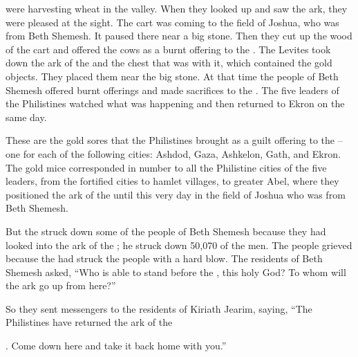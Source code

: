 {were harvesting
wheat
in the valley.
When
they looked
up and saw
the ark,
they were pleased
at
the sight.
The cart
was coming
to
the field
of Joshua,
who was from Beth Shemesh.
It paused
there
near
a big
stone.
Then they cut up
the
wood
of the cart
and offered
the cows
as a burnt offering
to the
{}.
The Levites
took down
the ark
of the {}
and the
chest
that
was with
it, which
contained
the gold
objects. They placed
them
near the big
stone.
At that time
the people
of Beth Shemesh
offered
burnt offerings
and made sacrifices
to the
{}.
The five
leaders
of the Philistines
watched
what was happening and then returned
to Ekron
on the same day.
\par }{\PP {}These
are the gold
sores
that
the Philistines
brought as a guilt offering
to the
{} –
one
for each
of the following cities: Ashdod,
Gaza,
Ashkelon,
Gath,
and Ekron.
The gold
mice
corresponded in number
to all
the Philistine
cities
of the five
leaders,
from the fortified
cities
to
hamlet
villages,
to
greater
Abel,
where
they positioned
the
ark
of the {}
until
this very
day
in the field
of Joshua
who was from Beth Shemesh.
\par }{\PP {}But the
{} struck down
some of the people
of Beth Shemesh
because
they had looked
into the ark
of the {}; he struck down
50,070
of the men.
The people
grieved
because
the {}
had struck
the people
with a hard
blow.
The residents
of Beth Shemesh
asked, “Who
is able
to stand
before
the {},
this
holy
God? To
whom
will the ark go up from here?”
\par }{\PP {}So they sent
messengers
to
the residents
of Kiriath Jearim,
saying,
“The Philistines
have returned
the
ark
of the

{}. Come down
here and take it back home with you.”

}
